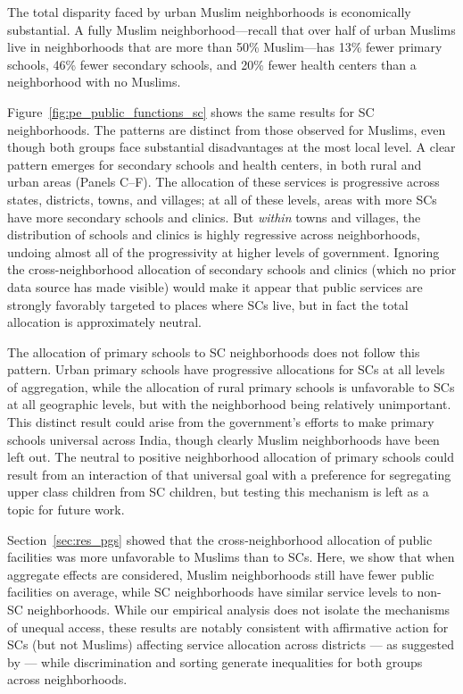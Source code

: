 \documentclass[12pt]{article}
\begin{document}
The total disparity faced by urban Muslim neighborhoods is economically substantial. A fully Muslim neighborhood---recall that over half of urban Muslims live in neighborhoods that are more than 50\% Muslim---has 13\% fewer primary schools, 46\% fewer secondary schools, and 20\% fewer health centers than a neighborhood with no Muslims.

Figure~\ref{fig:pe_public_functions_sc} shows the same results for SC neighborhoods. The patterns are distinct from those observed for Muslims, even though both groups face substantial disadvantages at the most local level. A clear pattern emerges for secondary schools and health centers, in both rural and urban areas (Panels C--F). The allocation of these services is progressive across states, districts, towns, and villages; at all of these levels, areas with more SCs have more secondary schools and clinics. But \textit{within} towns and villages, the distribution of schools and clinics is highly regressive across neighborhoods, undoing almost all of the progressivity at higher levels of government. Ignoring the cross-neighborhood allocation of secondary schools and clinics (which no prior data source has made visible) would make it appear that public services are strongly favorably targeted to places where SCs live, but in fact the total allocation is approximately neutral.

The allocation of primary schools to SC neighborhoods does not follow this pattern. Urban primary schools have progressive allocations for SCs at all levels of aggregation, while the allocation of rural primary schools is unfavorable to SCs at all geographic levels, but with the neighborhood being relatively unimportant. This distinct result could arise from the government's efforts to make primary schools universal across India, though clearly Muslim neighborhoods have been left out. The neutral to positive neighborhood allocation of primary schools could result from an interaction of that universal goal with a preference for segregating upper class children from SC children, but testing this mechanism is left as a topic for future work.

Section~\ref{sec:res_pgs} showed that the cross-neighborhood allocation of public facilities was more unfavorable to Muslims than to SCs. Here, we show that when aggregate effects are considered, Muslim neighborhoods still have fewer public facilities on average, while SC neighborhoods have similar service levels to non-SC neighborhoods. While our empirical analysis does not isolate the mechanisms of unequal access, these results are notably consistent with affirmative action for SCs (but not Muslims) affecting service allocation across districts --- as suggested by \citet{banerjee2007} --- while discrimination and sorting generate inequalities for both groups across neighborhoods.
\end{document}

